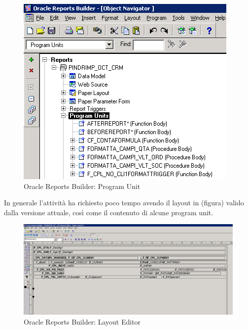 \begin{figure}[!h]
\thispagestyle{empty}
\centering
\includegraphics[scale=0.85]{img/RepPU.png}
\caption{Oracle Reports Builder: Program Unit}
\end{figure}
In generale l'attività ha richiesto poco tempo avendo il layout in (figura) valido dalla versione attuale, così come il contenuto di alcune program unit.
\begin{figure}[!h]
\thispagestyle{empty}
\centering
\includegraphics[scale=0.35]{img/ReportDIA.png}
\caption{Oracle Reports Builder: Layout Editor}
\end{figure}